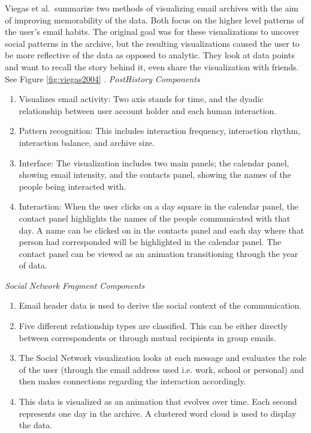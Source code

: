 \documentclass{egpubl}
\begin{document}
Viegas et al.\ summarize two methods of visualizing email archives with the aim of improving memorability of the data. Both focus on the higher level patterns of the user$'$s email habits. The original goal was for these visualizations to uncover social patterns in the archive, but the resulting visualizations caused the user to be more reflective of the data as opposed to analytic. They look at data points and want to recall the story behind it, even share the visualization with friends. See Figure \ref{fig:viegas2004} \cite{viegas2004}.
\textit{PostHistory Components}
\begin{enumerate}
\item Visualizes email activity: Two axis stands for time, and the dyadic relationship between user account holder and each human interaction.
\item Pattern recognition: This includes interaction frequency, interaction rhythm, interaction balance, and archive size.
\item Interface: The visualization includes two main panels; the calendar panel, showing email intensity, and the contacts panel, showing the names of the people being interacted with. 
\item Interaction: When the user clicks on a day square in the calendar panel, the contact panel highlights the names of the people communicated with that day. A name can be clicked on in the contacts panel and each day where that person had corresponded will be highlighted in the calendar panel. The contact panel can be viewed as an animation transitioning through the year of data.
\end{enumerate}
\textit{Social Network Fragment Components}
\begin{enumerate}
\item Email header data is used to derive the social context of the communication.
\item Five different relationship types are classified. This can be either directly between correspondents or through mutual recipients in group emails.
\item The Social Network visualization looks at each message and evaluates the role of the user (through the email address used i.e. work, school or personal) and then makes connections regarding the interaction accordingly. 
\item This data is visualized as an animation that evolves over time. Each second represents one day in the archive. A clustered word cloud is used to display the data.
\end{enumerate}
\end{document}
